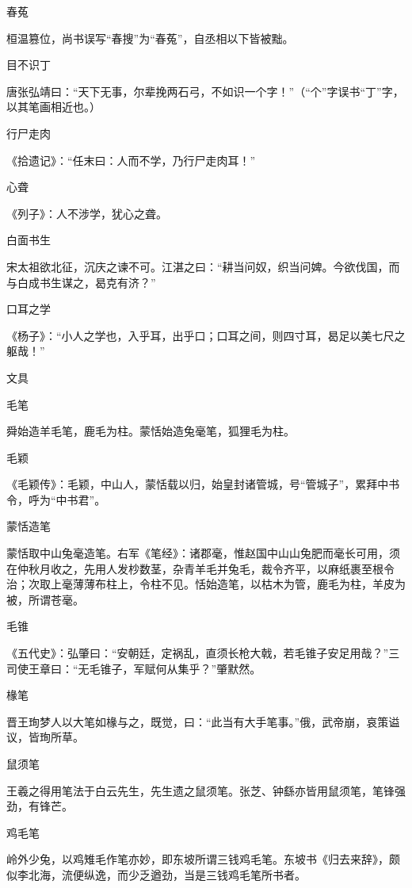 \documentclass[a4paper,12pt,UTF8,twoside]{ctexbook}
\begin{document}
    春菟
    
    桓温篡位，尚书误写“春搜”为“春菟”，自丞相以下皆被黜。
    
    目不识丁
    
    唐张弘靖曰：“天下无事，尔辈挽两石弓，不如识一个字！”（“个”字误书“丁”字，以其笔画相近也。）
    
    行尸走肉
    
    《拾遗记》：“任末曰：人而不学，乃行尸走肉耳！”
    
    心聋
    
    《列子》：人不涉学，犹心之聋。
    
    白面书生
    
    宋太祖欲北征，沉庆之谏不可。江湛之曰：“耕当问奴，织当问婢。今欲伐国，而与白成书生谋之，曷克有济？”
    
    口耳之学
    
    《杨子》：“小人之学也，入乎耳，出乎口；口耳之间，则四寸耳，曷足以美七尺之躯哉！”
    
    文具
    
    毛笔
    
    舜始造羊毛笔，鹿毛为柱。蒙恬始造兔毫笔，狐狸毛为柱。
    
    毛颖
    
    《毛颖传》：毛颖，中山人，蒙恬载以归，始皇封诸管城，号“管城子”，累拜中书令，呼为“中书君”。
    
    蒙恬造笔
    
    蒙恬取中山兔毫造笔。右军《笔经》：诸郡毫，惟赵国中山山兔肥而毫长可用，须在仲秋月收之，先用人发杪数茎，杂青羊毛并兔毛，裁令齐平，以麻纸裹至根令治；次取上毫薄薄布柱上，令柱不见。恬始造笔，以枯木为管，鹿毛为柱，羊皮为被，所谓苍毫。
    
    毛锥
    
    《五代史》：弘肇曰：“安朝廷，定祸乱，直须长枪大戟，若毛锥子安足用哉？”三司使王章曰：“无毛锥子，军赋何从集乎？”肇默然。
    
    椽笔
    
    晋王珣梦人以大笔如椽与之，既觉，曰：“此当有大手笔事。”俄，武帝崩，哀策谥议，皆珣所草。
    
    鼠须笔
    
    王羲之得用笔法于白云先生，先生遗之鼠须笔。张芝、钟繇亦皆用鼠须笔，笔锋强劲，有锋芒。
    
    鸡毛笔
    
    岭外少兔，以鸡雉毛作笔亦妙，即东坡所谓三钱鸡毛笔。东坡书《归去来辞》，颇似李北海，流便纵逸，而少乏遒劲，当是三钱鸡毛笔所书者。
    
\end{document}
